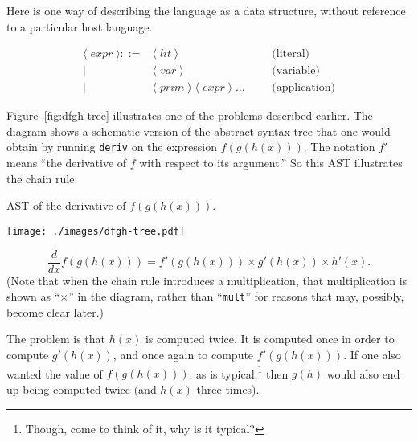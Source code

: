 \documentclass[11pt, a4paper]{article}
\newcommand{\cd}[1]{\texttt{#1}}
\begin{document}
Here is one way of describing the language as a data structure,
without reference to a particular host language. 
\newcommand{\nonterminal}[1]{\langle\operatorname{\textit{#1}}\rangle}
\newcommand{\lit}{\nonterminal{lit}}
\newcommand{\var}{\nonterminal{var}}
\newcommand{\prim}{\nonterminal{prim}}
\newcommand{\expr}{\nonterminal{expr}}

\begin{equation*}
  \begin{aligned}
    \expr  ::= {} & \lit &&& \text{(literal)} \\
             \mid {} & \var  &&& \text{(variable)} \\
             \mid {} & \prim \; \expr \; \dotsc &&& \text{(application)}
  \end{aligned}
\end{equation*}

Figure~\ref{fig:dfgh-tree} illustrates one of the problems described
earlier. The diagram shows a schematic version of the abstract syntax
tree that one would obtain by running \cd{deriv} on the expression
$f(g(h(x)))$. The notation $f'$ means ``the derivative of $f$ with
respect to its argument.'' So this AST illustrates the chain rule:
\begin{marginfigure}
  \caption{AST of the derivative of $f(g(h(x)))$.\label{fig:dfgh-tree}}
  \texttt{[image: ./images/dfgh-tree.pdf]}
\end{marginfigure}
\begin{equation*}
  \frac{d}{dx} f(g(h(x))) = f'(g(h(x))) \times g'(h(x)) \times h'(x).
\end{equation*}
(Note that when the chain rule introduces a multiplication, that
multiplication is shown as ``$\times$'' in the diagram, rather than
``\cd{mult}'' for reasons that may, possibly, become clear later.)

The problem is that $h(x)$ is computed twice. It is computed once in
order to compute $g'(h(x))$, and once again to compute
$f'(g(h(x)))$. If one also wanted the value of $f(g(h(x)))$, as is
typical,\footnote{Though, come to think of it, why is it typical?}
then $g(h)$ would also end up being computed twice (and $h(x)$ three
times).
\end{document}
